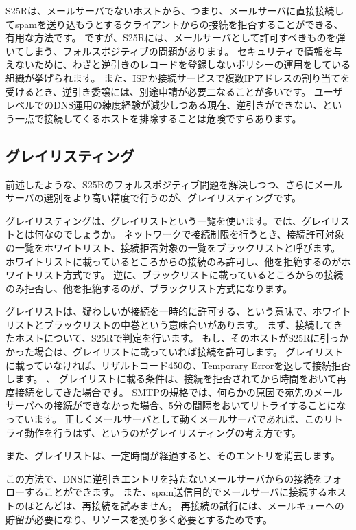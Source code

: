 S25Rは、メールサーバでないホストから、つまり、メールサーバに直接接続してspamを送り込もうとするクライアントからの接続を拒否することができる、有用な方法です。
ですが、S25Rには、メールサーバとして許可すべきものを弾いてしまう、フォルスポジティブの問題があります。
セキュリティで情報を与えないために、わざと逆引きのレコードを登録しないポリシーの運用をしている組織が挙げられます。
また、ISPか接続サービスで複数IPアドレスの割り当てを受けるとき、逆引き委譲には、別途申請が必要二なることが多いです。
ユーザレベルでのDNS運用の練度経験が減少しつある現在、逆引きができない、という一点で接続してくるホストを排除することは危険ですらあります。

\subsection{グレイリスティング}

前述したような、S25Rのフォルスポジティブ問題を解決しつつ、さらにメールサーバの選別をより高い精度で行うのが、グレイリスティングです。

グレイリスティングは、グレイリストという一覧を使います。では、グレイリストとは何なのでしょうか。
ネットワークで接続制限を行うとき、接続許可対象の一覧をホワイトリスト、接続拒否対象の一覧をブラックリストと呼びます。
ホワイトリストに載っているところからの接続のみ許可し、他を拒絶するのがホワイトリスト方式です。
逆に、ブラックリストに載っているところからの接続のみ拒否し、他を拒絶するのが、ブラックリスト方式になります。

グレイリストは、疑わしいが接続を一時的に許可する、という意味で、ホワイトリストとブラックリストの中巻という意味合いがあります。
まず、接続してきたホストについて、S25Rで判定を行います。
もし、そのホストがS25Rに引っかかった場合は、グレイリストに載っていれば接続を許可します。
グレイリストに載っていなければ、リザルトコード450の、Temporary Errorを返して接続拒否します。
、
グレイリストに載る条件は、接続を拒否されてから時間をおいて再度接続をしてきた場合です。
SMTPの規格では、何らかの原因で宛先のメールサーバへの接続ができなかった場合、5分の間隔をおいてリトライすることになっています。
正しくメールサーバとして動くメールサーバであれば、このリトライ動作を行うはず、というのがグレイリスティングの考え方です。

また、グレイリストは、一定時間が経過すると、そのエントリを消去します。

この方法で、DNSに逆引きエントリを持たないメールサーバからの接続をフォローすることができます。
また、spam送信目的でメールサーバに接続するホストのほとんどは、再接続を試みません。
再接続の試行には、メールキューへの貯留が必要になり、リソースを拠り多く必要とするためです。


